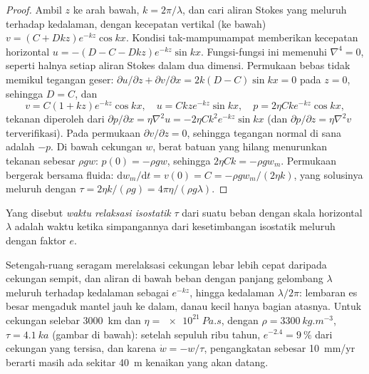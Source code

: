 \begin{proof}
Ambil $z$ ke arah bawah, $k = 2\pi/\lambda$, dan cari aliran Stokes yang meluruh
terhadap kedalaman, dengan kecepatan vertikal (ke bawah) $v = (C + Dkz)e^{-kz}\cos kx$.
Kondisi tak-mampumampat memberikan kecepatan horizontal $u = -(D - C - Dkz)e^{-kz}\sin
kx$. Fungsi-fungsi ini memenuhi $\nabla^4 = 0$, seperti halnya setiap aliran Stokes dalam
dua dimensi. Permukaan bebas tidak memikul tegangan geser: $\partial u/\partial
z + \partial v/\partial x = 2k(D - C)\sin kx = 0$ pada $z = 0$, sehingga $D = C$, dan
\[
  v = C(1 + kz)e^{-kz}\cos kx,\quad u = Ckze^{-kz}\sin kx,\quad
  p = 2\eta Cke^{-kz}\cos kx,
\]
tekanan diperoleh dari $\partial p/\partial x = \eta\nabla^2u = -2\eta
Ck^2e^{-kz}\sin kx$ (dan $\partial p/\partial z = \eta\nabla^2v$ terverifikasi). Pada
permukaan $\partial v/\partial z = 0$, sehingga tegangan normal di sana adalah $-p$. Di bawah
cekungan $w$, berat batuan yang hilang menurunkan tekanan sebesar $\rho
gw$: $p(0) = -\rho gw$, sehingga $2\eta Ck = -\rho gw_m$. Permukaan bergerak bersama
fluida: $\mathrm dw_m/\mathrm dt = v(0) = C = -\rho gw_m/(2\eta k)$, yang
solusinya meluruh dengan $\tau = 2\eta k/(\rho g) = 4\pi\eta/(\rho g\lambda)$.
\end{proof}

\begin{definition}\label{def:b3:mantle-convection:relaxation-time}
Yang disebut \emph{waktu relaksasi isostatik} $\tau$ dari
suatu beban dengan skala horizontal $\lambda$ adalah waktu ketika simpangannya dari
kesetimbangan isostatik meluruh dengan faktor $e$.
\end{definition}

Setengah-ruang seragam merelaksasi cekungan lebar lebih cepat daripada cekungan sempit, dan
aliran di bawah beban dengan panjang gelombang $\lambda$ meluruh terhadap kedalaman sebagai $e^{-kz}$, hingga
kedalaman $\lambda/2\pi$: lembaran es besar mengaduk mantel jauh ke dalam, danau kecil
hanya bagian atasnya. Untuk cekungan selebar \qty{3000}{km} dan $\eta =
\qty{e21}{Pa.s}$, dengan $\rho = \qty{3300}{kg.m^{-3}}$, $\tau = \qty{4.1}{ka}$
(gambar di bawah): setelah sepuluh ribu tahun, $e^{-2.4} = \qty{9}{\percent}$ dari
cekungan yang tersisa, dan karena $\dot w = -w/\tau$, pengangkatan sebesar
\qty{10}{mm/yr} berarti masih ada sekitar \qty{40}{m} kenaikan yang akan datang.

